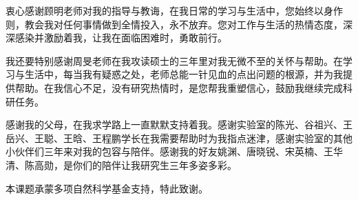 
\begin{acknowledgements}
	
	衷心感谢顾明老师对我的指导与教诲，在我日常的学习与生活中，您始终以身作则，教会我对任何事情做到全情投入，永不放弃。您对工作与生活的热情态度，深深感染并激励着我，让我在面临困难时，勇敢前行。
	
	我还要特别感谢周旻老师在我攻读硕士的三年里对我无微不至的关怀与帮助。在学习与生活中，每当我有疑惑之处，老师总能一针见血的点出问题的根源，并为我提供帮助。在我信心不足，没有研究热情时，是您帮我重塑信心，鼓励我继续完成科研任务。
	
	感谢我的父母，在我求学路上一直默默支持着我。感谢实验室的陈光、谷祖兴、王岳兴、王聪、王晗、王程鹏学长在我需要帮助时为我指点迷津，感谢实验室的其他小伙伴们三年来对我的包容与陪伴。感谢我的好友姚渊、唐晓锐、宋英楠、王华清、陈高勋，是你们的陪伴让我研究生三年多姿多彩。
	
	本课题承蒙多项自然科学基金支持，特此致谢。
	
	
	
\end{acknowledgements}
